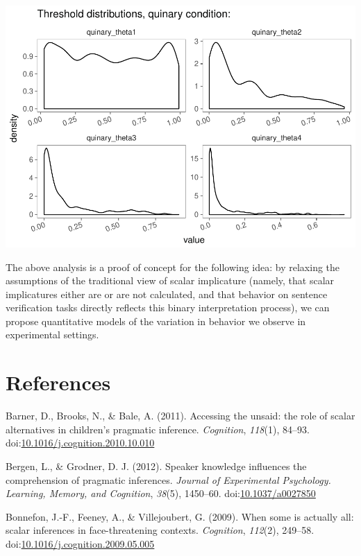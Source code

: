 \documentclass[floatsintext,man]{apa6}
\theoremstyle{definition}
\theoremstyle{definition}
\theoremstyle{definition}
\theoremstyle{remark}
\begin{document}
\includegraphics{writeup_files/figure-latex/unnamed-chunk-1-4.pdf}

The above analysis is a proof of concept for the following idea: by
relaxing the assumptions of the traditional view of scalar implicature
(namely, that scalar implicatures either are or are not calculated, and
that behavior on sentence verification tasks directly reflects this
binary interpretation process), we can propose quantitative models of
the variation in behavior we observe in experimental settings.

\section{References}\label{references}

\setlength{\parindent}{-0.5in} \setlength{\leftskip}{0.5in}

\hypertarget{refs}{}
\hypertarget{ref-Barner2011}{}
Barner, D., Brooks, N., \& Bale, A. (2011). Accessing the unsaid: the
role of scalar alternatives in children's pragmatic inference.
\emph{Cognition}, \emph{118}(1), 84--93.
doi:\href{https://doi.org/10.1016/j.cognition.2010.10.010}{10.1016/j.cognition.2010.10.010}

\hypertarget{ref-Bergen2012}{}
Bergen, L., \& Grodner, D. J. (2012). Speaker knowledge influences the
comprehension of pragmatic inferences. \emph{Journal of Experimental
Psychology. Learning, Memory, and Cognition}, \emph{38}(5), 1450--60.
doi:\href{https://doi.org/10.1037/a0027850}{10.1037/a0027850}

\hypertarget{ref-Bonnefon2009}{}
Bonnefon, J.-F., Feeney, A., \& Villejoubert, G. (2009). When some is
actually all: scalar inferences in face-threatening contexts.
\emph{Cognition}, \emph{112}(2), 249--58.
doi:\href{https://doi.org/10.1016/j.cognition.2009.05.005}{10.1016/j.cognition.2009.05.005}
\end{document}
